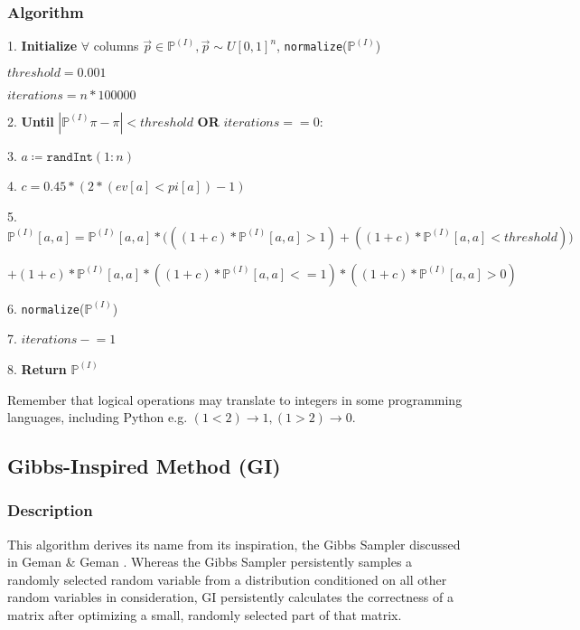 \documentclass{article}
\begin{document}
\subsubsection{Algorithm}
1. \textbf{Initialize}
$\forall$ columns $\vec{p} \in \mathbb{P}^{(I)}, \vec{p} \sim U[0,1]^n$, \texttt{normalize}($\mathbb{P}^{(I)}$)

\hspace{2cm} $threshold = 0.001$

\hspace{2cm} $iterations = n*100000$

2. \textbf{Until} $|\mathbb{P}^{(I)}\pi - \pi| < threshold$ \textbf{OR} $iterations == 0:$

3. \hspace{1cm} $a \coloneqq \texttt{randInt}(1:n)$

4. \hspace{1cm} $c = 0.45*(2*(ev[a] < pi[a]) - 1)$

5. \hspace{1cm} $\mathbb{P}^{(I)}[a,a] = \mathbb{P}^{(I)}[a,a]*\bigg( ((1+c)*\mathbb{P}^{(I)}[a,a] > 1) + ((1+c)*\mathbb{P}^{(I)}[a,a] < threshold) \bigg)$

    \hspace{4cm} $+ (1+c)*\mathbb{P}^{(I)}[a,a]*((1+c)*\mathbb{P}^{(I)}[a,a] <= 1)*((1+c)*\mathbb{P}^{(I)}[a,a] > 0)$

6. \hspace{1cm} \texttt{normalize}($\mathbb{P}^{(I)}$)

7. \hspace{1cm} $iterations \mathrel{-}= 1$

8. \textbf{Return} $\mathbb{P}^{(I)}$

Remember that logical operations may translate to integers in some programming languages, including Python e.g. $(1 < 2) \rightarrow 1, (1 > 2) \rightarrow 0$.

\subsection{Gibbs-Inspired Method (GI)}
\subsubsection{Description}
This algorithm derives its name from its inspiration, the Gibbs Sampler discussed in Geman \& Geman \cite{Geman}. Whereas the Gibbs Sampler persistently samples a randomly selected random variable from a distribution conditioned on all other random variables in consideration, GI persistently calculates the correctness of a matrix after optimizing a small, randomly selected part of that matrix.
\end{document}
